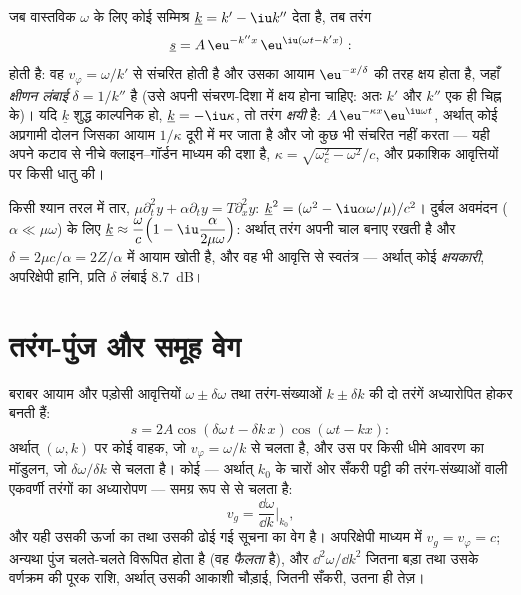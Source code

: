 \begin{definition}[सम्मिश्र तरंग-संख्या: संचरण और क्षीणन]\label{def:b2:dispersion-wave-packets:complex}
जब  वास्तविक $\omega$ के लिए कोई सम्मिश्र
$\underline k = k' - \iu k''$ देता है, तब तरंग
\[
\underline s = A\,\eu^{-k''x}\,\eu^{\iu(\omega t - k'x)} :
\]
होती है: वह $v_\varphi = \omega/k'$ से संचरित होती है और उसका आयाम
$\eu^{-x/\delta}$ की तरह क्षय होता है, जहाँ \emph{क्षीणन लंबाई} $\delta = 1/k''$ है (उसे
अपनी संचरण-दिशा में क्षय होना चाहिए: अतः $k'$ और $k''$ एक ही चिह्न के)।
यदि $\underline k$ शुद्ध काल्पनिक हो, $\underline k = -\iu\kappa$, तो तरंग
\emph{क्षयी} है: $A\,\eu^{-\kappa x}\eu^{\iu\omega t}$, अर्थात् कोई अप्रगामी दोलन
जिसका आयाम $1/\kappa$ दूरी में मर जाता है और जो कुछ भी संचरित नहीं करता
--- यही अपने कटाव से नीचे क्लाइन--गॉर्डन माध्यम की दशा है,
$\kappa = \sqrt{\omega_c^2 - \omega^2}/c$, और प्रकाशिक आवृत्तियों पर किसी धातु की।
\end{definition}

\begin{example}[अवमंदित तार]\label{ex:b2:dispersion-wave-packets:damped}
किसी श्यान तरल में तार, $\mu\partial_t^2y + \alpha\partial_ty = T\partial_x^2y$:
$\underline k^2 = (\omega^2 - \iu\alpha\omega/\mu)/c^2$। दुर्बल अवमंदन ($\alpha \ll \mu
\omega$) के लिए $\underline k \approx \dfrac\omega c\Bigl(1 - \iu\dfrac{\alpha}{2\mu\omega}\Bigr)$: अर्थात् तरंग
अपनी चाल बनाए रखती है और $\delta = 2\mu c/\alpha = 2Z/\alpha$ में आयाम खोती है,
और वह भी आवृत्ति से स्वतंत्र --- अर्थात् कोई \emph{क्षयकारी}, अपरिक्षेपी हानि,
प्रति $\delta$ लंबाई \qty{8.7}{dB}।
\end{example}

\section{तरंग-पुंज और समूह वेग}

\begin{proposition}[विस्पंद; समूह वेग]\label{prop:b2:dispersion-wave-packets:group}
बराबर आयाम और पड़ोसी आवृत्तियों $\omega \pm
\delta\omega$ तथा तरंग-संख्याओं $k \pm \delta k$ की दो तरंगें अध्यारोपित होकर बनती हैं:
\[
s = 2A\cos(\delta\omega\,t - \delta k\,x)\cos(\omega t - kx) :
\]
अर्थात् $(\omega, k)$ पर कोई वाहक, जो $v_\varphi = \omega/k$ से चलता है, और उस पर
किसी धीमे आवरण का मॉडुलन, जो $\delta\omega/\delta k$ से चलता है। कोई \emph{} ---
अर्थात् $k_0$ के चारों ओर सँकरी पट्टी की तरंग-संख्याओं वाली एकवर्णी तरंगों का
अध्यारोपण --- समग्र रूप से \emph{} से चलता है:
\[
v_g = \frac{\dd\omega}{\dd k}\Bigr|_{k_0} ,
\]
और यही उसकी ऊर्जा का तथा उसकी ढोई गई सूचना का वेग है।
अपरिक्षेपी माध्यम में $v_g = v_\varphi = c$; अन्यथा पुंज चलते-चलते
विरूपित होता है (वह \emph{फैलता} है), और $\dd^2\omega/\dd k^2$ जितना बड़ा तथा
उसके वर्णक्रम की पूरक राशि, अर्थात् उसकी आकाशी चौड़ाई, जितनी सँकरी, उतना
ही तेज़।
\end{proposition}

